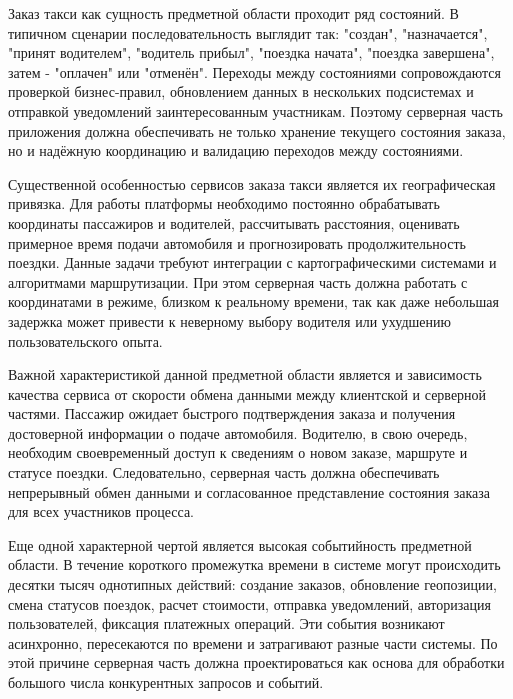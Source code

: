 {	\par \redline Заказ такси как сущность предметной области проходит ряд состояний. В типичном сценарии последовательность выглядит так: "создан"{}, "назначается"{}, "принят водителем"{}, "водитель прибыл"{}, "поездка начата"{}, "поездка завершена"{}, затем - "оплачен"{} или "отменён"{}. Переходы между состояниями сопровождаются проверкой бизнес-правил, обновлением данных в нескольких подсистемах и отправкой уведомлений заинтересованным участникам. Поэтому серверная часть приложения должна обеспечивать не только хранение текущего состояния заказа, но и надёжную координацию и валидацию переходов между состояниями.
	
	\par \redline Существенной особенностью сервисов заказа такси является их географическая привязка. Для работы платформы необходимо постоянно обрабатывать координаты пассажиров и водителей, рассчитывать расстояния, оценивать примерное время подачи автомобиля и прогнозировать продолжительность поездки. Данные задачи требуют интеграции с картографическими системами и алгоритмами маршрутизации. При этом серверная часть должна работать с координатами в режиме, близком к реальному времени, так как даже небольшая задержка может привести к неверному выбору водителя или ухудшению пользовательского опыта.
	
	\par \redline Важной характеристикой данной предметной области является и зависимость качества сервиса от скорости обмена данными между клиентской и серверной частями. Пассажир ожидает быстрого подтверждения заказа и получения достоверной информации о подаче автомобиля. Водителю, в свою очередь, необходим своевременный доступ к сведениям о новом заказе, маршруте и статусе поездки. Следовательно, серверная часть должна обеспечивать непрерывный обмен данными и согласованное представление состояния заказа для всех участников процесса.
	
	\par \redline Еще одной характерной чертой является высокая событийность предметной области. В течение короткого промежутка времени в системе могут происходить десятки тысяч однотипных действий: создание заказов, обновление геопозиции, смена статусов поездок, расчет стоимости, отправка уведомлений, авторизация пользователей, фиксация платежных операций. Эти события возникают асинхронно, пересекаются по времени и затрагивают разные части системы. По этой причине серверная часть должна проектироваться как основа для обработки большого числа конкурентных запросов и событий.
	
}
